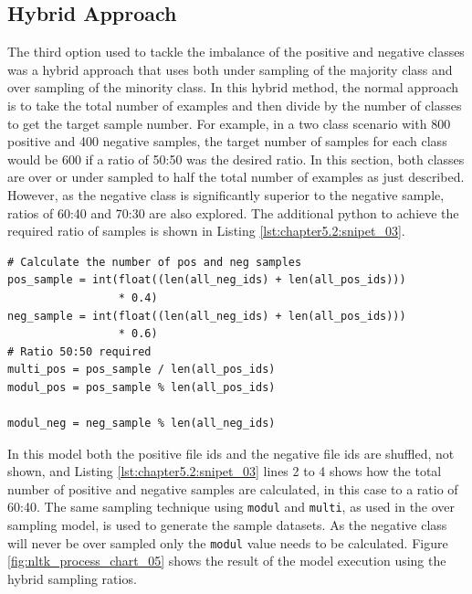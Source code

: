 \subsection{Hybrid Approach}
The third option used to tackle the imbalance of the positive and negative classes was a hybrid approach that uses both under sampling of the majority class and over sampling of the minority class. In this hybrid method, the normal approach is to take the total number of examples and then divide by the number of classes to get the target sample number. For example, in a two class scenario with 800 positive and 400 negative samples, the target number of samples for each class would be 600 if a ratio of 50:50 was the desired ratio. In this section, both classes are over or under sampled to half the total number of examples as just described. However, as the negative class is significantly superior to the negative sample, ratios of 60:40 and 70:30 are also explored. The additional python to achieve the required ratio of samples is shown in Listing \ref{lst:chapter5.2:snipet_03}.

\begin{lstlisting}[caption={Hybrid approach using both over and under sampling}, label=lst:chapter5.2:snipet_03]
# Calculate the number of pos and neg samples
pos_sample = int(float((len(all_neg_ids) + len(all_pos_ids)))
                 * 0.4)
neg_sample = int(float((len(all_neg_ids) + len(all_pos_ids)))
                 * 0.6)
# Ratio 50:50 required
multi_pos = pos_sample / len(all_pos_ids)
modul_pos = pos_sample % len(all_pos_ids)

modul_neg = neg_sample % len(all_neg_ids)
\end{lstlisting}

In this model both the positive file ids and the negative file ids are shuffled, not shown, and Listing \ref{lst:chapter5.2:snipet_03} lines 2 to 4 shows how the total number of positive and negative samples are calculated, in this case to a ratio of 60:40. The same sampling technique using \verb|modul| and \verb|multi|, as used in the over sampling model, is used to generate the sample datasets. As the negative class will never be over sampled only the \verb|modul| value needs to be calculated. Figure \ref{fig:nltk_process_chart_05} shows the result of the model execution using the hybrid sampling ratios.

